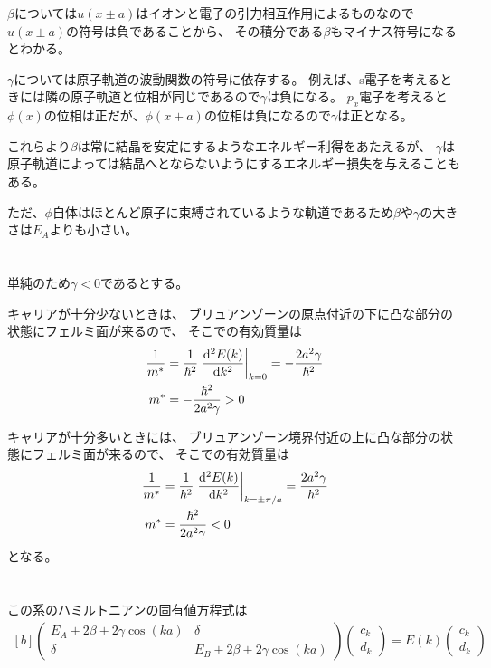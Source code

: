 \documentclass[../ap_2012.tex]{subfiles}
\begin{document}
\(\beta\)については\(u(x\pm a)\)はイオンと電子の引力相互作用によるものなので\(u(x\pm a)\)の符号は負であることから、
その積分である\(\beta\)もマイナス符号になるとわかる。

\(\gamma\)については原子軌道の波動関数の符号に依存する。
例えば、s電子を考えるときには隣の原子軌道と位相が同じであるので\(\gamma\)は負になる。
\(p_x\)電子を考えると\(\phi(x)\)の位相は正だが、\(\phi(x+a)\)の位相は負になるので\(\gamma\)は正となる。

これらより\(\beta\)は常に結晶を安定にするようなエネルギー利得をあたえるが、
\(\gamma\)は原子軌道によっては結晶へとならないようにするエネルギー損失を与えることもある。

ただ、\(\phi\)自体はほとんど原子に束縛されているような軌道であるため\(\beta\)や\(\gamma\)の大きさは\(E_A\)よりも小さい。

\section{}
単純のため\(\gamma<0\)であるとする。

キャリアが十分少ないときは、
ブリュアンゾーンの原点付近の下に凸な部分の状態にフェルミ面が来るので、
そこでの有効質量は
\begin{equation}\begin{aligned}[b]
    \frac{1}{m^*}&=\frac{1}{\hbar^2}\left.\dv[2]{E(k)}{k}\right|_{k=0} = -\frac{2a^2\gamma}{\hbar^2}\\
    m ^*&= -\frac{\hbar^2 }{2a^2\gamma} > 0
\end{aligned}\end{equation}

キャリアが十分多いときには、
ブリュアンゾーン境界付近の上に凸な部分の状態にフェルミ面が来るので、
そこでの有効質量は
\begin{equation}\begin{aligned}[b]
    \frac{1}{m^*}&=\frac{1}{\hbar^2}\left.\dv[2]{E(k)}{k}\right|_{k=\pm \pi/a} = \frac{2a^2\gamma}{\hbar^2}\\
    m ^*&= \frac{\hbar^2 }{2a^2\gamma} < 0
\end{aligned}\end{equation}
となる。

\section{}
この系のハミルトニアンの固有値方程式は
\begin{equation}\begin{aligned}[b]
    \begin{pmatrix}
        E_A+2\beta +2\gamma\cos(ka) & \delta\\
        \delta & E_B+2\beta +2\gamma\cos(ka)
    \end{pmatrix}\begin{pmatrix}
        c_k\\
        d_k
    \end{pmatrix}
    =E(k)\begin{pmatrix}
        c_k\\
        d_k
    \end{pmatrix}
\end{aligned}\end{equation}
\end{document}
